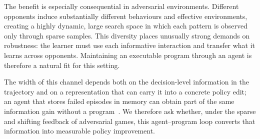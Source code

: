 The benefit is especially consequential in adversarial environments. Different
opponents induce substantially different behaviours and effective environments,
creating a highly dynamic, large search space in which each pattern is observed only
through sparse samples. This diversity places unusually strong demands on robustness:
the learner must use each informative interaction and transfer what it learns across
opponents. Maintaining an executable program through an agent is therefore a natural
fit for this setting.

\begin{center}
\end{center}

%
The width of this channel depends both on the decision-level information in the
trajectory and on a representation that can carry it into a concrete policy edit;
an agent that stores failed episodes in memory can obtain part of the same
information gain without a program~\citep{echo2025hindsight}. We therefore ask whether,
under the sparse and shifting feedback of adversarial games, this agent--program
loop converts that information into measurable policy improvement.

